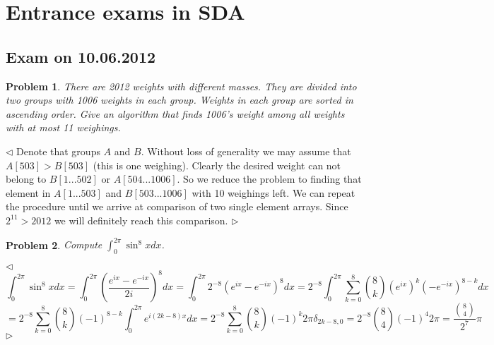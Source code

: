 \documentclass[12pt]{article}
\newtheorem{problem}{Problem}[subsection]
\newenvironment{solution}{\par $\triangleleft$}{$\triangleright$}
\begin{document}
 
 
\newpage 
 
\section{Entrance exams in SDA}
 
\subsection{Exam on 10.06.2012}
 
\begin{problem} There are 2012 weights with different masses. They are divided into two groups with 1006 weights in each group. Weights in each group are sorted in ascending order. Give an algorithm that finds 1006's weight among all weights with at most 11 weighings.
\end{problem}
\begin{solution} Denote that groups $A$ and $B$. Without loss of generality we may assume that $A[503]>B[503]$ (this is one weighing). Clearly the desired weight can not belong to $B[1...502]$ or $A[504...1006]$. So we reduce the problem to finding that element in $A[1...503]$ and $B[503...1006]$ with 10 weighings left. We can repeat the procedure until we arrive at comparison of two single element arrays. Since $2^{11}>2012$ we will definitely reach this comparison.
\end{solution}
 
\begin{problem} Compute $\int_{0}^{2\pi} \sin ^8xdx$.
\end{problem}
\begin{solution}
$$
\int_0^{2\pi}\sin^8xdx
=\int_0^{2\pi}\left(\frac{e^{ix}-e^{-ix}}{2i}\right)^8dx
=\int_0^{2\pi}2^{-8}(e^{ix}-e^{-ix})^8dx
=2^{-8}\int_0^{2\pi}\sum_{k=0}^8\binom{8}{k}(e^{ix})^k(-e^{-ix})^{8-k}dx
$$
$$
=2^{-8}\sum_{k=0}^8\binom{8}{k}(-1)^{8-k}\int_0^{2\pi}e^{i(2k-8)x}dx
=2^{-8}\sum_{k=0}^8\binom{8}{k}(-1)^{k}2\pi\delta_{2k-8,0}
=2^{-8}\binom{8}{4}(-1)^{4}2\pi
=\frac{\binom{8}{4}}{2^7}\pi
$$ 
\end{solution}
 
\end{document}
